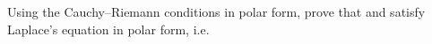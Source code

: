 \begin{EMexercise}{}

Using the Cauchy--Riemann conditions in polar form, prove that  and  satisfy Laplace's equation in polar form, i.e.

\end{EMexercise}
